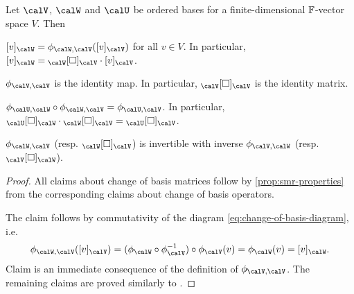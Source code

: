 \begin{proposition}
    Let $\calV$, $\calW$ and $\calU$ be ordered bases for a finite-dimensional $\mathbb{F}$-vector space $V$. Then
    \begin{enumproposition}
        \item \label{enum:basis-change-coordvec} $\coordvec{v}{\calW} = \basischange{\calW}{\calV} (\coordvec{v}{\calV})$ for all $v \in V$. In particular, $\coordvec{v}{\calW} = \basischangemat{\calW}{\calV} \cdot \coordvec{v}{\calV}$.

        \item \label{enum:basis-change-identity-map} $\basischange{\calV}{\calV}$ is the identity map. In particular, $\basischangemat{\calV}{\calV}$ is the identity matrix.

        \item $\basischange{\calU}{\calW} \circ \basischange{\calW}{\calV} = \basischange{\calU}{\calV}$. In particular, $\basischangemat{\calU}{\calW} \cdot \basischangemat{\calW}{\calV} = \basischangemat{\calU}{\calV}$.

        \item $\basischange{\calW}{\calV}$ (resp. $\basischangemat{\calW}{\calV}$) is invertible with inverse $\basischange{\calV}{\calW}$ (resp. $\basischangemat{\calV}{\calW}$).
    \end{enumproposition}
\end{proposition}

\begin{proof}
    All claims about change of basis matrices follow by \cref{prop:smr-properties} from the corresponding claims about change of basis operators.

    The claim  follows by commutativity of the diagram \cref{eq:change-of-basis-diagram}, i.e.
    \begin{equation*}
        \basischange{\calW}{\calV} (\coordvec{v}{\calV})
            = (\coordmap{\calW} \circ \inv{\coordmap{\calV}}) \circ \coordmap{\calV}(v)
            = \coordmap{\calW}(v)
            = \coordvec{v}{\calW}.
    \end{equation*}
    Claim  is an immediate consequence of the definition of $\basischange{\calV}{\calV}$. The remaining claims are proved similarly to .
\end{proof}

